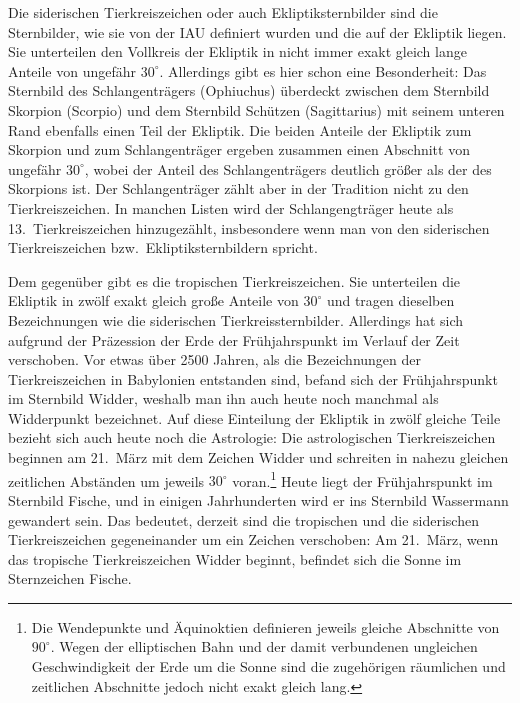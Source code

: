 Die siderischen Tierkreiszeichen oder auch Ekliptiksternbilder
sind die Sternbilder, wie sie von der IAU definiert wurden und die auf der Ekliptik liegen. Sie unterteilen den
Vollkreis der Ekliptik in nicht immer exakt gleich lange Anteile von ungef\"ahr $30^\circ$. Allerdings gibt es hier schon 
eine Besonderheit: Das Sternbild des Schlangentr\"agers (Ophiuchus) \"uberdeckt zwischen dem Sternbild 
Skorpion (Scorpio) und dem Sternbild Sch\"utzen (Sagittarius) mit seinem unteren Rand ebenfalls einen 
Teil der Ekliptik. 
Die beiden Anteile der Ekliptik zum Skorpion und zum Schlangentr\"ager ergeben zusammen
einen Abschnitt von ungef\"ahr $30^\circ$, wobei der Anteil des Schlangentr\"agers deutlich gr\"o\ss er als der des
Skorpions ist. Der Schlangentr\"ager z\"ahlt aber in der Tradition nicht zu den Tierkreiszeichen. In manchen Listen
wird der Schlangengtr\"ager heute als 13.\ Tierkreiszeichen hinzugez\"ahlt, insbesondere wenn man von den
siderischen Tierkreiszeichen bzw.\ Ekliptiksternbildern spricht. 

Dem gegen\"uber gibt es die tropischen Tierkreiszeichen. Sie unterteilen die Ekliptik in zw\"olf exakt gleich gro\ss e
Anteile von $30^\circ$ und tragen dieselben Bezeichnungen wie die siderischen Tierkreissternbilder. 
Allerdings hat sich aufgrund der Pr\"azession der Erde der Fr\"uhjahrspunkt im Verlauf der Zeit verschoben. Vor etwas
\"uber 2500 Jahren, als die Bezeichnungen der Tierkreiszeichen in Babylonien entstanden sind, 
befand sich der Fr\"uhjahrspunkt im
Sternbild Widder, weshalb man ihn auch heute noch manchmal als 
Widderpunkt bezeichnet. Auf diese Einteilung
der Ekliptik in zw\"olf gleiche Teile bezieht sich auch heute noch die Astrologie: Die astrologischen Tierkreiszeichen 
beginnen am 21.\ M\"arz mit dem Zeichen Widder und schreiten in nahezu gleichen zeitlichen Abst\"anden um jeweils
$30^\circ$ voran.\footnote{Die Wendepunkte und \"Aquinoktien definieren jeweils gleiche Abschnitte von $90^\circ$.
Wegen der elliptischen Bahn und der damit verbundenen ungleichen Geschwindigkeit der Erde um die Sonne 
sind die zugeh\"origen r\"aumlichen und zeitlichen Abschnitte jedoch nicht
exakt gleich lang.} Heute liegt der Fr\"uhjahrspunkt im Sternbild Fische, und in einigen Jahrhunderten wird er
ins Sternbild Wassermann gewandert sein. Das bedeutet, derzeit sind die tropischen und die 
siderischen Tierkreiszeichen gegeneinander um ein Zeichen verschoben: Am 21.\ M\"arz, 
wenn das tropische Tierkreiszeichen Widder
beginnt, befindet sich die Sonne im Sternzeichen Fische.  

